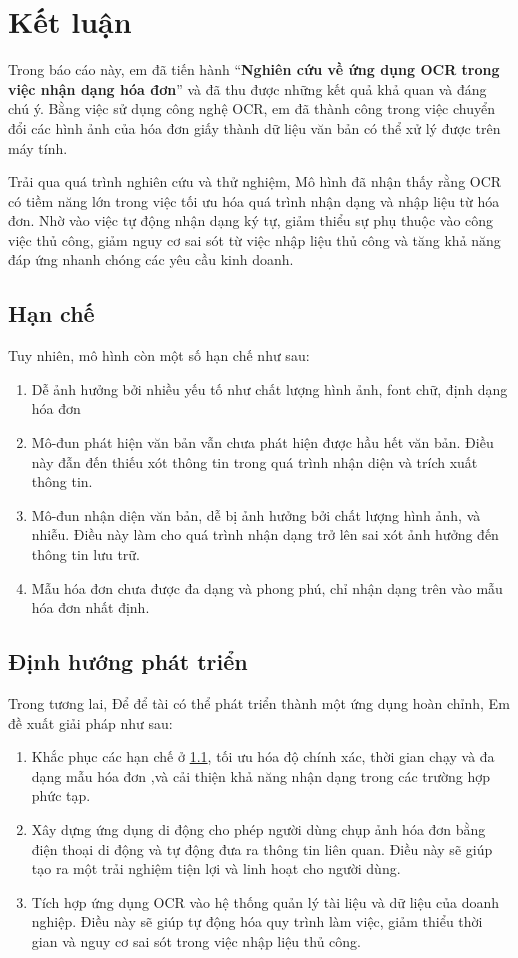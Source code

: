 \chapter{Kết luận}
Trong báo cáo này, em đã tiến hành ``\textbf{Nghiên cứu về ứng dụng OCR trong việc nhận dạng hóa đơn}'' và đã thu được những kết quả khả quan và đáng chú ý. Bằng việc sử dụng công nghệ OCR, em đã thành công trong việc chuyển đổi các hình ảnh của hóa đơn giấy thành dữ liệu văn bản có thể xử lý được trên máy tính.

Trải qua quá trình nghiên cứu và thử nghiệm, Mô hình đã nhận thấy rằng OCR có tiềm năng lớn trong việc tối ưu hóa quá trình nhận dạng và nhập liệu từ hóa đơn. Nhờ vào việc tự động nhận dạng ký tự, giảm thiểu sự phụ thuộc vào công việc thủ công, giảm nguy cơ sai sót từ việc nhập liệu thủ công và tăng khả năng đáp ứng nhanh chóng các yêu cầu kinh doanh.

\section{Hạn chế} \label{hanche}
Tuy nhiên, mô hình còn một số hạn chế như sau:
\begin{enumerate}
    \item Dễ ảnh hưởng bởi nhiều yếu tố như chất lượng hình ảnh, font chữ, định dạng
    hóa đơn
    \item Mô-đun phát hiện văn bản vẫn chưa phát hiện được hầu hết văn bản. Điều này đẫn đến thiếu xót thông tin trong quá trình nhận diện và trích xuất thông tin.
    \item Mô-đun nhận diện văn bản, dễ bị ảnh hưởng bởi chất lượng hình ảnh, và nhiễu. Điều này làm cho quá trình nhận dạng trở lên sai xót ảnh hưởng đến thông tin lưu trữ.
    \item Mẫu hóa đơn chưa được đa dạng và phong phú, chỉ nhận dạng trên vào mẫu hóa đơn nhất định.
\end{enumerate}

\section{Định hướng phát triển}
Trong tương lai, Để để tài có thể phát triển thành một ứng dụng hoàn chỉnh, Em đề xuất giải pháp như sau:
\begin{enumerate}
    \item Khắc phục các hạn chế ở \ref{hanche}, tối ưu hóa độ chính xác, thời gian chạy và đa dạng mẫu hóa đơn ,và cải thiện khả năng nhận dạng trong các trường hợp phức tạp.
    \item Xây dựng ứng dụng di động cho phép người dùng chụp ảnh hóa đơn bằng điện thoại di động và tự động đưa ra thông tin liên quan. Điều này sẽ giúp tạo ra một trải nghiệm tiện lợi và linh hoạt cho người dùng.
    \item Tích hợp ứng dụng OCR vào hệ thống quản lý tài liệu và dữ liệu của doanh nghiệp. Điều này sẽ giúp tự động hóa quy trình làm việc, giảm thiểu thời gian và nguy cơ sai sót trong việc nhập liệu thủ công.
\end{enumerate}

